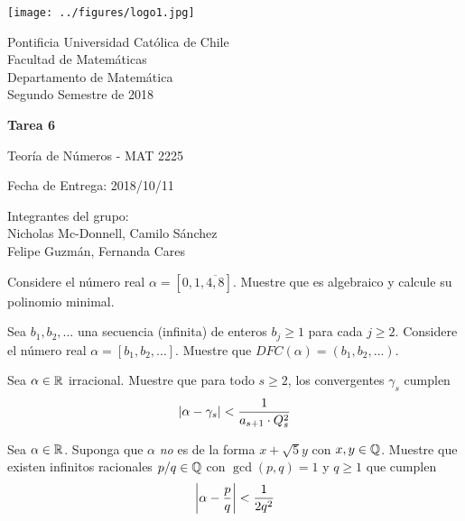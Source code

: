 


\begin{minipage}{2.5cm}
	\texttt{[image: ../figures/logo1.jpg]}
\end{minipage}
\begin{minipage}{13cm}
	\begin{flushleft}
		\raggedright
		{
			\noindent
			{\sc Pontificia Universidad Católica de Chile\\
				Facultad de Matemáticas\\
				Departamento de Matemática} \smallskip \\
			Segundo Semestre de 2018\\
		}
	\end{flushleft}
\end{minipage}

\vspace{2ex}
{\Large \centerline{\bf Tarea 6}}
{\large \centerline{Teoría de Números - MAT 2225}}
\centerline{Fecha de Entrega: 2018/10/11}

\begin{flushright}
	Integrantes del grupo:\\
	Nicholas Mc-Donnell, Camilo Sánchez\\
	Felipe Guzmán, Fernanda Cares
\end{flushright}

\begin{prob}[5 pts.]
    Considere el número real $\alpha=[0,1,\overline{4,8}]$. Muestre que es algebraico y calcule su polinomio minimal.
\end{prob}

\begin{sol}
    
\end{sol}

\begin{prob}[5 pts.]
    Sea $b_1,b_2,...$ una secuencia (infinita) de enteros $b_j\geq1$ para cada $j\geq2$. Considere el número real $\alpha=[b_1,b_2,...]$. Muestre que $DFC(\alpha)=(b_1,b_2,...)$.
\end{prob}

\begin{sol}
    
\end{sol}

\begin{prob}[5 pts.]
    Sea $\alpha\in\mathbb{R}$ irracional. Muestre que para todo $s\geq 2$, los convergentes $\gamma_s$ cumplen
    \[
        \left|\alpha-\gamma_s\right|<\frac{1}{a_{s+1}\cdot Q_s^2}
    \]
\end{prob}

\begin{sol}
    
\end{sol}

\begin{prob}[5 pts.]
    Sea $\alpha\in\mathbb{R}$. Suponga que $\alpha$ \textit{no} es de la forma $x+\sqrt{5}y$ con $x,y\in\mathbb{Q}$. Muestre que existen infinitos racionales $p/q\in\mathbb{Q}$ con $\gcd(p,q)=1$ y $q\geq 1$ que cumplen
    \[
        \left|\alpha-\frac{p}{q}\right|<\frac1{2q^2}
    \]
\end{prob}

